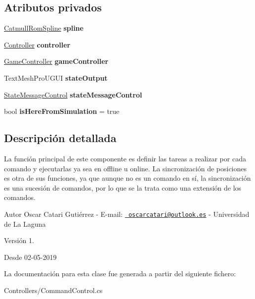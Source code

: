 \subsection*{Atributos privados}
\begin{DoxyCompactItemize}
\item 
\mbox{\label{class_command_control_ab72421d3afbbddc7a15ba11aa15e85d8}} 
\mbox{\hyperlink{class_catmull_rom_spline}{Catmull\+Rom\+Spline}} {\bfseries spline}
\item 
\mbox{\label{class_command_control_a38700e69a9a434ca92bb4cbf1aef5545}} 
\mbox{\hyperlink{class_controller}{Controller}} {\bfseries controller}
\item 
\mbox{\label{class_command_control_abb4378198632f261d94a4b6445de3a7b}} 
\mbox{\hyperlink{class_game_controller}{Game\+Controller}} {\bfseries game\+Controller}
\item 
\mbox{\label{class_command_control_acf463ac500d31f872adf3cf235f3facc}} 
Text\+Mesh\+Pro\+U\+G\+UI {\bfseries state\+Output}
\item 
\mbox{\label{class_command_control_a1eef363ceb2574b4e0df8d8d21c02b5a}} 
\mbox{\hyperlink{class_state_message_control}{State\+Message\+Control}} {\bfseries state\+Message\+Control}
\item 
\mbox{\label{class_command_control_a66c19bcb9897bf2f13b5f952d3729a90}} 
bool {\bfseries is\+Here\+From\+Simulation} = true
\end{DoxyCompactItemize}


\subsection{Descripción detallada}
La función principal de este componente es definir las tareas a realizar por cada comando y ejecutarlas ya sea en offline u online. La sincronización de posiciones es otra de sus funciones, ya que aunque no es un comando en sí, la sincronización es una sucesión de comandos, por lo que se la trata como una extensión de los comandos. \begin{DoxyAuthor}{Autor}
Oscar Catari Gutiérrez -\/ E-\/mail\+: \href{mailto:oscarcatari@outlook.es}{\texttt{ oscarcatari@outlook.\+es}} -\/ Universidad de La Laguna 
\end{DoxyAuthor}
\begin{DoxyVersion}{Versión}
1. 
\end{DoxyVersion}
\begin{DoxySince}{Desde}
02-\/05-\/2019 
\end{DoxySince}


La documentación para esta clase fue generada a partir del siguiente fichero\+:\begin{DoxyCompactItemize}
\item 
Controllers/Command\+Control.\+cs\end{DoxyCompactItemize}
